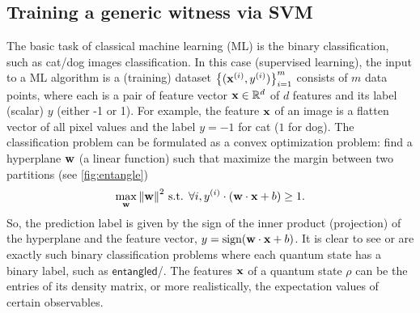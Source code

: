 \documentclass[
aps,
pra,
twocolumn,
floatfix,
]{revtex4-2}
\theoremstyle{plain}
\theoremstyle{definition}
\newcommand{\dm}{\rho}
\newcommand{\entangled}{\textsf{entangled}}
\begin{document}
\subsection{Training a generic witness via SVM}
The basic task of classical machine learning (ML) is the binary classification,
such as cat/dog images classification. 
In this case (supervised learning), the input to a ML algorithm is a (training) dataset $\qty{(\vb{x}^{(i)},y^{(i)})}_{i=1}^m$ consists of $m$ data points, 
where each is a pair of feature vector $\vb{x}\in \mathbb{R}^d$ of $d$ features and its label (scalar) $y$ (either -1 or 1).
For example, the feature $\vb{x}$ of an image is a flatten vector of all pixel values and the label $y=-1$ for \textsf{cat} ($1$ for \textsf{dog}).
The classification problem can be formulated as a convex optimization problem:
find a hyperplane $\vb{w}$ (a linear function) such that maximize the margin between two partitions (see \cref{fig:entangle})
\begin{equation}
	\max_{\vb{w}}
	\norm{\vb{w}}^2
	\text{ s.t. }
	\forall i , y^{(i)}\cdot (\vb{w}\cdot\vb{x}+b)\ge 1.
	\label{eq:svm_opt}
\end{equation}
So, the prediction label is given by the sign of the inner product (projection) of the hyperplane and the feature vector, $y=\text{sign}(\vb{w}\cdot\vb{x}+b)$.
It is clear to see  or  are exactly such binary classification problems where each quantum state has a binary label, such as  $\entangled$/\textsf{}.
The features $\vb{x}$ of a quantum state $\dm$ can be the entries of its density matrix, or more realistically, the expectation values of certain observables.
\end{document}
